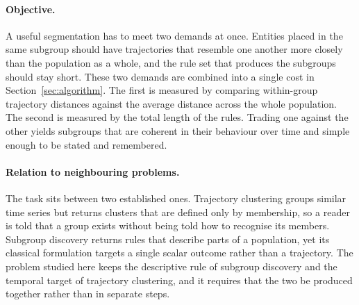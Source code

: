 \paragraph{Objective.} A useful segmentation has to meet two demands at once. Entities placed in the same subgroup should have trajectories that resemble one another more closely than the population as a whole, and the rule set that produces the subgroups should stay short. These two demands are combined into a single cost in Section~\ref{sec:algorithm}. The first is measured by comparing within-group trajectory distances against the average distance across the whole population. The second is measured by the total length of the rules. Trading one against the other yields subgroups that are coherent in their behaviour over time and simple enough to be stated and remembered.

\paragraph{Relation to neighbouring problems.} The task sits between two established ones. Trajectory clustering groups similar time series but returns clusters that are defined only by membership, so a reader is told that a group exists without being told how to recognise its members. Subgroup discovery returns rules that describe parts of a population, yet its classical formulation targets a single scalar outcome rather than a trajectory. The problem studied here keeps the descriptive rule of subgroup discovery and the temporal target of trajectory clustering, and it requires that the two be produced together rather than in separate steps.
